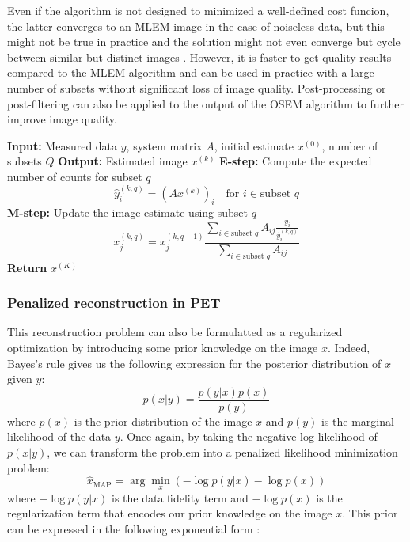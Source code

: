 Even if the algorithm is not designed to minimized a well-defined cost funcion, the latter converges to an MLEM image in the case of noiseless data, but this might not be true in practice and the solution might not even converge but cycle between similar but distinct images \cite{6152654}.
However, it is faster to get quality results compared to the MLEM algorithm and can be used in practice with a large number of subsets without significant loss of image quality.
Post-processing or post-filtering can also be applied to the output of the OSEM algorithm to further improve image quality.

\begin{algorithm}
\caption{Ordered Subset Expectation Maximization (OSEM)}
\begin{algorithmic}[1]
\State \textbf{Input:} Measured data $y$, system matrix $A$, initial estimate $x^{(0)}$, number of subsets $Q$
\State \textbf{Output:} Estimated image $x^{(k)}$
        \State \textbf{E-step:} Compute the expected number of counts for subset $q$
        \begin{equation*}
            \hat{y}_{i}^{(k,q)} = (Ax^{(k)})_i \quad \text{for } i \in \text{subset } q
        \end{equation*}
        \State \textbf{M-step:} Update the image estimate using subset $q$
        \begin{equation*}
            x_j^{(k,q)} = x_j^{(k,q-1)} \frac{\sum_{i \in \text{subset } q} A_{ij} \frac
            {y_i}{\hat{y}_i^{(k,q)}}}{\sum_{i \in \text{subset } q} A_{ij}}
        \end{equation*}
    \EndFor
\EndFor
\State \textbf{Return} $x^{(K)}$
\end{algorithmic}
\label{alg:osem}
\end{algorithm}

\subsubsection{Penalized reconstruction in PET}

This reconstruction problem can also be formulatted as a regularized optimization by introducing some prior knowledge on the image $x$.
Indeed, Bayes's rule gives us the following expression for the posterior distribution of $x$ given $y$:
\begin{equation}
    p(x|y) = \frac{p(y|x) p(x)}{p(y)}
\end{equation}
where $p(x)$ is the prior distribution of the image $x$ and $p(y)$ is the marginal likelihood of the data $y$.
Once again, by taking the negative log-likelihood of $p(x|y)$, we can transform the problem into a penalized likelihood minimization problem:
\begin{equation}
    \hat{x}_{\text{MAP}} = \arg \min_{x} \left( -\log p(y|x) - \log p(x) \right)
\end{equation}
where $-\log p(y|x)$ is the data fidelity term and $-\log p(x)$ is the regularization term that encodes our prior knowledge on the image $x$.
This prior can be expressed in the following exponential form :

